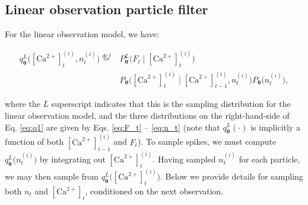 \documentclass[10pt]{article}
\providecommand{\ve}[1]{\boldsymbol{#1}}
\providecommand{\ve}[1]{\boldsymbol{#1}}
\newcommand{\thetn}{\ve{\theta}}
\newcommand{\p}{P_{\thetn}}
\newcommand{\q}{q\big(\ve{H}_t^{(i)}\big)}
\newcommand{\Ca}{[\text{Ca}^{2+}]}
\begin{document}
\subsection{Linear observation particle filter} \label{sec:LOOPSI}

For the linear observation model,  we have:

\begin{align}
\label{eq:q1}
q_{\thetn}^L\big(\Ca_t^{(i)}, n_t^{(i)}\big) \overset{def}{=}&  \p^L\big(F_t \mid \Ca_t^{(i)}\big) \nonumber \\
& \p\big(\Ca_t^{(i)} \mid \Ca_{t-1}^{(i)}, n_t^{(i)}\big) \p\big(n_t^{(i)}\big),
\end{align}

%

\noindent %
where the $L$ superscript indicates that this is the sampling distribution for the linear observation model, and the three distributions on the right-hand-side of Eq. \ref{eq:q1} are given by Eqs. \ref{eq:F_t} -- \ref{eq:n_t} (note that $q_{\thetn}^L(\cdot)$ is implicitly a function of both $\Ca_{t-1}^{(i)}$ and $F_t$).  To sample spikes, we must compute $q_{\thetn}^L\big(n_t^{(i)})$ by integrating out $\Ca_t^{(i)}$.  Having sampled $n_t^{(i)}$ for each particle, we may then sample from $q_{\thetn}^L\big(\Ca_t^{(i)}\big)$. Below we provide details for sampling both $n_t$ and $\Ca_t$, conditioned on the next observation.
\end{document}
